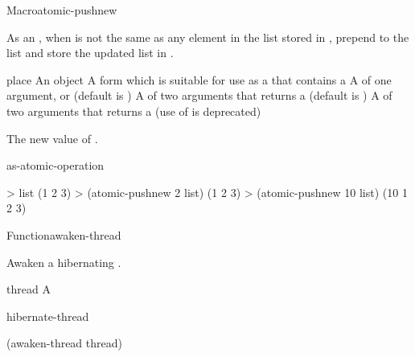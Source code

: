 \begin{functiondoc}{Macro}{atomic-pushnew}{ 
     
    \returns{} }
%

\fnsyntax

\fnpurpose As an , when  is not
the same as any element in the list stored in , prepend
 to the list and store the updated list in .

\fnpackage {}

\fnmodule {}

\fnargs
\begin{args}{place}
\arg[item] An object
\arg[place] A form which is suitable for use as a
 that contains a  
\arg[key] A  of one argument, or \nil{} (default is \nil)
\arg[test] A  of two arguments that returns a
 (default is ) 
 A  of two arguments that returns a
 (use of  is deprecated)
\end{args}

\fnreturns The new value of . 

\begin{alsos}{as-atomic-operation}
\end{alsos}

\fnexamples
\begin{example}
> list
(1 2 3)
> (atomic-pushnew 2 list)
(1 2 3)
> (atomic-pushnew 10 list)
(10 1 2 3)
\end{example}

\end{functiondoc}


\begin{functiondoc}{Function}{awaken-thread}{}
%
%

\fnsyntax

\fnpurpose Awaken a hibernating .

\fnpackage {}

\fnmodule {}

\fnargs
\begin{args}{thread}
\arg[thread] A 
\end{args}

\fnerrors
\nothreads{}

\begin{alsos}{hibernate-thread}
\end{alsos}

\fnexample
\begin{example}
  (awaken-thread thread)
\end{example}

\end{functiondoc}

